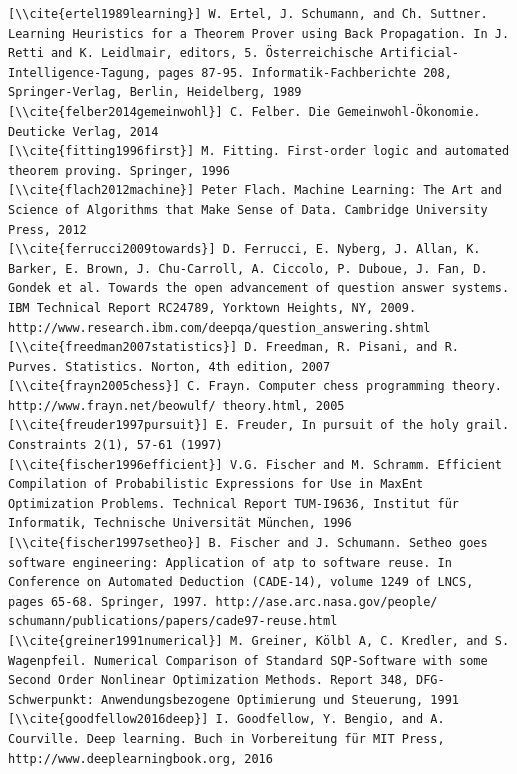 \documentclass[10pt]{book}
\begin{document}
\begin{verbatim}
[\\cite{ertel1989learning}] W. Ertel, J. Schumann, and Ch. Suttner. Learning Heuristics for a Theorem Prover using Back Propagation. In J. Retti and K. Leidlmair, editors, 5. Österreichische Artificial-Intelligence-Tagung, pages 87-95. Informatik-Fachberichte 208, Springer-Verlag, Berlin, Heidelberg, 1989
[\\cite{felber2014gemeinwohl}] C. Felber. Die Gemeinwohl-Ökonomie. Deuticke Verlag, 2014
[\\cite{fitting1996first}] M. Fitting. First-order logic and automated theorem proving. Springer, 1996
[\\cite{flach2012machine}] Peter Flach. Machine Learning: The Art and Science of Algorithms that Make Sense of Data. Cambridge University Press, 2012
[\\cite{ferrucci2009towards}] D. Ferrucci, E. Nyberg, J. Allan, K. Barker, E. Brown, J. Chu-Carroll, A. Ciccolo, P. Duboue, J. Fan, D. Gondek et al. Towards the open advancement of question answer systems. IBM Technical Report RC24789, Yorktown Heights, NY, 2009. http://www.research.ibm.com/deepqa/question_answering.shtml
[\\cite{freedman2007statistics}] D. Freedman, R. Pisani, and R. Purves. Statistics. Norton, 4th edition, 2007
[\\cite{frayn2005chess}] C. Frayn. Computer chess programming theory. http://www.frayn.net/beowulf/ theory.html, 2005
[\\cite{freuder1997pursuit}] E. Freuder, In pursuit of the holy grail. Constraints 2(1), 57-61 (1997)
[\\cite{fischer1996efficient}] V.G. Fischer and M. Schramm. Efficient Compilation of Probabilistic Expressions for Use in MaxEnt Optimization Problems. Technical Report TUM-I9636, Institut für Informatik, Technische Universität München, 1996
[\\cite{fischer1997setheo}] B. Fischer and J. Schumann. Setheo goes software engineering: Application of atp to software reuse. In Conference on Automated Deduction (CADE-14), volume 1249 of LNCS, pages 65-68. Springer, 1997. http://ase.arc.nasa.gov/people/ schumann/publications/papers/cade97-reuse.html
[\\cite{greiner1991numerical}] M. Greiner, Kölbl A, C. Kredler, and S. Wagenpfeil. Numerical Comparison of Standard SQP-Software with some Second Order Nonlinear Optimization Methods. Report 348, DFG-Schwerpunkt: Anwendungsbezogene Optimierung und Steuerung, 1991
[\\cite{goodfellow2016deep}] I. Goodfellow, Y. Bengio, and A. Courville. Deep learning. Buch in Vorbereitung für MIT Press, http://www.deeplearningbook.org, 2016

\end{verbatim}
\end{document}
